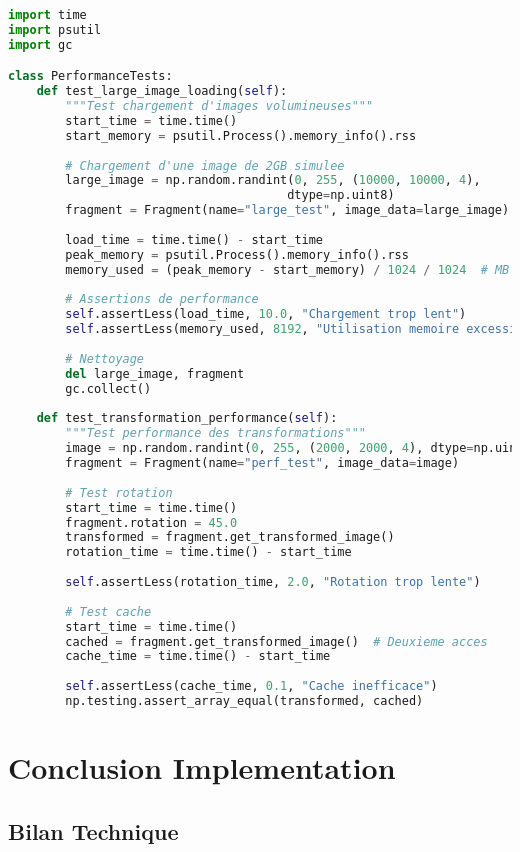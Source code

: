 \documentclass[12pt,a4paper]{article}
\begin{document}
\begin{lstlisting}[language=Python]
import time
import psutil
import gc

class PerformanceTests:
    def test_large_image_loading(self):
        """Test chargement d'images volumineuses"""
        start_time = time.time()
        start_memory = psutil.Process().memory_info().rss
        
        # Chargement d'une image de 2GB simulee
        large_image = np.random.randint(0, 255, (10000, 10000, 4), 
                                       dtype=np.uint8)
        fragment = Fragment(name="large_test", image_data=large_image)
        
        load_time = time.time() - start_time
        peak_memory = psutil.Process().memory_info().rss
        memory_used = (peak_memory - start_memory) / 1024 / 1024  # MB
        
        # Assertions de performance
        self.assertLess(load_time, 10.0, "Chargement trop lent")
        self.assertLess(memory_used, 8192, "Utilisation memoire excessive")
        
        # Nettoyage
        del large_image, fragment
        gc.collect()
    
    def test_transformation_performance(self):
        """Test performance des transformations"""
        image = np.random.randint(0, 255, (2000, 2000, 4), dtype=np.uint8)
        fragment = Fragment(name="perf_test", image_data=image)
        
        # Test rotation
        start_time = time.time()
        fragment.rotation = 45.0
        transformed = fragment.get_transformed_image()
        rotation_time = time.time() - start_time
        
        self.assertLess(rotation_time, 2.0, "Rotation trop lente")
        
        # Test cache
        start_time = time.time()
        cached = fragment.get_transformed_image()  # Deuxieme acces
        cache_time = time.time() - start_time
        
        self.assertLess(cache_time, 0.1, "Cache inefficace")
        np.testing.assert_array_equal(transformed, cached)
\end{lstlisting}

\section{Conclusion Implementation}

\subsection{Bilan Technique}
\end{document}
